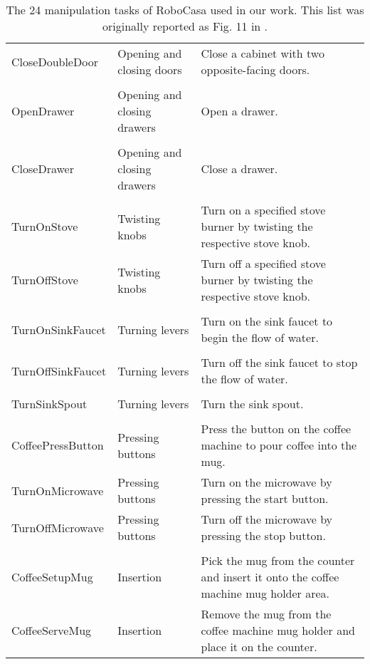 \begin{table}[t!]
\begin{tabularx}{\textwidth}{l l X}
        CloseDoubleDoor             & Opening and closing doors & Close a cabinet with two opposite-facing doors. \\ \\
        OpenDrawer                  & Opening and closing drawers & Open a drawer. \\ \\
        CloseDrawer                 & Opening and closing drawers & Close a drawer. \\\hline
        \\
        TurnOnStove                 & Twisting knobs & Turn on a specified stove burner by twisting the respective stove knob. \\
        TurnOffStove                & Twisting knobs & Turn off a specified stove burner by twisting the respective stove knob. \\ \hline \\
        TurnOnSinkFaucet            & Turning levers & Turn on the sink faucet to begin the flow of water. \\ \\
        TurnOffSinkFaucet           & Turning levers & Turn off the sink faucet to stop the flow of water. \\ \\
        TurnSinkSpout               & Turning levers & Turn the sink spout. \\ \hline \\
        CoffeePressButton           & Pressing buttons & Press the button on the coffee machine to pour coffee into the mug. \\ 
        TurnOnMicrowave             & Pressing buttons & Turn on the microwave by pressing the start button. \\ 
        TurnOffMicrowave            & Pressing buttons & Turn off the microwave by pressing the stop button. \\ \hline \\
        CoffeeSetupMug              & Insertion & Pick the mug from the counter and insert it onto the coffee machine mug holder area. \\
        CoffeeServeMug              & Insertion & Remove the mug from the coffee machine mug holder and place it on the counter. \\
        \bottomrule
    \end{tabularx}
    \caption{The 24 manipulation tasks of RoboCasa used in our work. This list was originally reported as Fig. 11 in \citet{robocasa2024}.}
    \label{tab:robo_casa}
\end{table}

\begin{longtable}{|p{3cm}|p{4cm}|p{8cm}|}
\hline

\end{longtable}